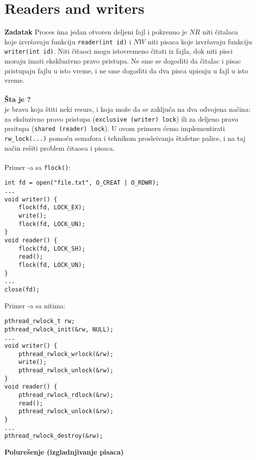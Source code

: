 \clearpage
\section{\latin Readers and writers}
\textbf{\large Zadatak} Proces ima jedan otvoren deljeni fajl i pokrenuo je $NR$ niti \v{c}italaca koje izvr\v{s}avaju funkciju \texttt{reader(int id)} i $NW$ niti pisaca koje izvr\v{s}avaju funkciju \texttt{writer(int id)}. Niti \v{c}itaoci mogu istovremeno \v{c}itati iz fajla, dok niti pisci moraju imati ekskluzivno pravo pristupa. Ne sme se dogoditi da \v{c}italac i pisac pristupaju fajlu u isto vreme, i ne sme dogoditi da dva pisca upisuju u fajl u isto vreme.\\\\
\textbf{\v{S}ta je ?}\\
 je brava koja \v{s}titi neki resurs, i koja mo\v{z}e da se zaklju\v{c}a na dva odvojena na\v{c}ina: za eksluzivno pravo pristupa (\texttt{exclusive (writer) lock}) ili za deljeno pravo prsitupa (\texttt{shared (reader) lock}). U ovom primeru \'{c}emo implementirati \texttt{rw\_lock(...)} pomo\'{c}u semafora i tehnikom prosle\dj{}ivanja \v{s}tafetne palice, i na taj na\v{c}in re\v{s}iti problem \v{c}itaoca i pisaca.
\\\\
Primer -a sa \texttt{flock()}:
\begin{lstlisting}
int fd = open("file.txt", O_CREAT | O_RDWR);
...
void writer() {
    flock(fd, LOCK_EX);
    write();
    flock(fd, LOCK_UN);
}
void reader() {
    flock(fd, LOCK_SH);
    read();
    flock(fd, LOCK_UN);
}
...
close(fd);
\end{lstlisting}
Primer -a sa  nitima:
\begin{lstlisting}
pthread_rwlock_t rw;
pthread_rwlock_init(&rw, NULL);
...
void writer() {
    pthread_rwlock_wrlock(&rw);
    write();
    pthread_rwlock_unlock(&rw);
}
void reader() {
    pthread_rwlock_rdlock(&rw);
    read();
    pthread_rwlock_unlock(&rw);
}
...
pthread_rwlock_destroy(&rw);
\end{lstlisting}
\textbf{\large Polure\v{s}enje (izgladnjivanje pisaca)}\\
